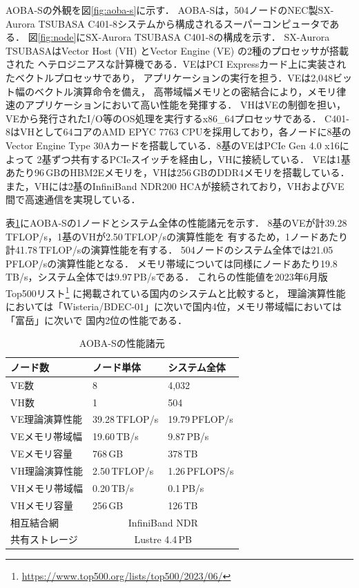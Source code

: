 ﻿\documentclass[submit,techrep,noauthor]{ipsj}
\begin{document}
AOBA-Sの外観を図\ref{fig:aoba-s}に示す．
AOBA-Sは，504ノードのNEC製SX-Aurora TSUBASA C401-8システムから構成されるスーパーコンピュータである．
図\ref{fig:node}にSX-Aurora TSUBASA C401-8の構成を示す．
SX-Aurora TSUBASAはVector Host (VH) とVector Engine (VE) の2種のプロセッサが搭載された
ヘテロジニアスな計算機である．VEはPCI Expressカード上に実装されたベクトルプロセッサであり，
アプリケーションの実行を担う．VEは2,048ビット幅のベクトル演算命令を備え，
高帯域幅メモリとの密結合により，メモリ律速のアプリケーションにおいて高い性能を発揮する．
VHはVEの制御を担い，VEから発行されたI/O等のOS処理を実行するx86\_64プロセッサである．
C401-8はVHとして64コアのAMD EPYC 7763 CPUを採用しており，各ノードに8基のVector Engine Type
30Aカードを搭載している．8基のVEはPCIe Gen 4.0 x16によって
2基ずつ共有するPCIeスイッチを経由し，VHに接続している．
VEは1基あたり96\,GBのHBM2Eメモリを，VHは256\,GBのDDR4メモリを搭載している．また，VHには2基のInfiniBand
NDR200 HCAが接続されており，VHおよびVE間で高速通信を実現している．

表\ref{tbl:aoba-s}にAOBA-Sの1ノードとシステム全体の性能諸元を示す．
8基のVEが計39.28\,TFLOP/s，1基のVHが2.50\,TFLOP/sの演算性能を
有するため，1ノードあたり計41.78\,TFLOP/sの演算性能を有する．
504ノードのシステム全体では21.05\,PFLOP/sの演算性能となる．
メモリ帯域については同様にノードあたり19.8\,TB/s，システム全体では9.97\,PB/sである．
これらの性能値を2023年6月版Top500リスト\footnote{\url{https://www.top500.org/lists/top500/2023/06/}}
に掲載されている国内のシステムと比較すると，
理論演算性能においては「Wisteria/BDEC-01」に次いで国内4位，メモリ帯域幅においては「富岳」に次いで
国内2位の性能である．

\begin{table}[tb]
\centering
\caption{AOBA-Sの性能諸元}\label{tbl:aoba-s}
\begin{tabular}{@{}lll@{}}
\toprule
ノード数        & ノード単体     & システム全体           \\ \midrule
VE数            & 8              & 4,032                  \\ \midrule
VH数            & 1              & 504                    \\
VE理論演算性能  & 39.28\,TFLOP/s & 19.79\,PFLOP/s         \\
VEメモリ帯域幅  & 19.60\,TB/s    & 9.87\,PB/s             \\
VEメモリ容量    & 768\,GB        & 378\,TB                \\ \midrule
VH理論演算性能  & 2.50\,TFLOP/s  & 1.26\,PFLOPS/s         \\
VHメモリ帯域幅  & 0.20\,TB/s     & 0.1\,PB/s              \\
VHメモリ容量    & 256\,GB        & 126\,TB                \\ \midrule
相互結合網      & \multicolumn{2}{c}{InfiniBand NDR}      \\
共有ストレージ  & \multicolumn{2}{c}{Lustre 4.4\,PB}      \\ \bottomrule
\end{tabular}
\end{table}
\end{document}
